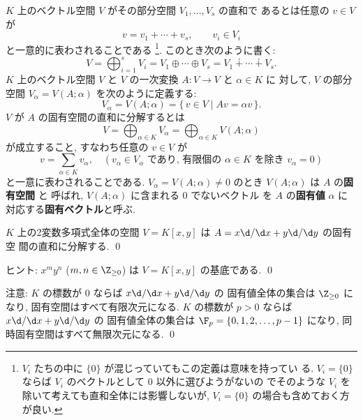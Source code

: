 \documentclass[12pt,twoside]{jarticle}
\newcommand\commentout[1]{#1}
\newcommand\commentout[1]{}
\begin{document}
$K$ 上のベクトル空間 $V$ がその部分空間 $V_1,\dots,V_s$ の直和で
あるとは任意の $v\in V$ が
\begin{equation*}
  v = v_1 + \cdots + v_s,
  \qquad
  v_i\in V_i
\end{equation*}
と一意的に表わされることである%
\footnote{$V_i$ たちの中に $\{0\}$ が混じっていてもこの定義は意味を持ってい
  る.  $V_i=\{0\}$ ならば $V_i$ のベクトルとして $0$ 以外に選びようがないの
  でそのような $V_i$ を除いて考えても直和全体には影響しないが, $V_i=\{0\}$ 
  の場合も含めておく方が良い.}.  %
このとき次のように書く:
\begin{equation*}
  V = \bigoplus_{i=1}^s V_i
    = V_1\oplus\cdots\oplus V_s 
    = V_1\dotplus\cdots\dotplus V_s.
\end{equation*}
$K$ 上のベクトル空間 $V$ と $V$ の一次変換 $A:V\to V$ と $\alpha\in K$ に
対して, $V$ の部分空間 $V_\alpha=V(A;\alpha)$ を次のように定義する:
\begin{equation*}
  V_\alpha = V(A;\alpha) = \{\, v\in V \mid Av = \alpha v \,\}.
\end{equation*}
$V$ が $A$ の固有空間の直和に分解するとは
\begin{equation*}
  V = \bigoplus_{\alpha\in K} V_\alpha = \bigoplus_{\alpha\in K} V(A;\alpha)
\end{equation*}
が成立すること, すなわち任意の $v\in V$ が
\begin{equation*}
  v = \sum_{\alpha\in K} v_\alpha, 
  \quad
  (\text{$v_\alpha\in V_\alpha$ であり, 
    有限個の $\alpha\in K$ を除き $v_\alpha=0$})
\end{equation*}
と一意に表わされることである.
$V_\alpha=V(A;\alpha)\ne 0$ のとき $V(A;\alpha)$ は $A$ の{\bf 固有空間} と
呼ばれ, $V(A;\alpha)$ に含まれる $0$ でないベクトル
を $A$ の{\bf 固有値} $\alpha$ に対応する{\bf 固有ベクトル}と呼ぶ.


\begin{question}
\label{q:xdx+ydy}
  $K$ 上の2変数多項式全体の空間 $V=K[x,y]$ は $A=x\d/\d x+y\d/\d y$ の固有空
  間の直和に分解する. \qed
\end{question}

\noindent
ヒント: $x^my^n$ ($m,n\in\Z_{\ge0}$) は $V=K[x,y]$ の基底である.
\qed

\commentout{
\medskip
\noindent
注意: $K$ の標数が $0$ ならば $x\d/\d x+y\d/\d y$ の
固有値全体の集合は $\Z_{\ge0}$ になり, 
固有空間はすべて有限次元になる.
$K$ の標数が $p>0$ ならば $x\d/\d x+y\d/\d y$ の
固有値全体の集合は $\F_p=\{0,1,2,\dots,p-1\}$ になり, 
同時固有空間はすべて無限次元になる. 
\qed
}
\end{document}
